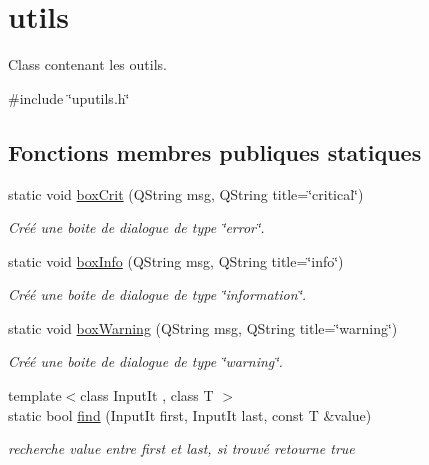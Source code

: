 \hypertarget{classutils}{}\section{utils}
\label{classutils}


Class contenant les outils.  




{\ttfamily \#include \char`\"{}uputils.\+h\char`\"{}}

\subsection*{Fonctions membres publiques statiques}
\begin{DoxyCompactItemize}
\item 
static void \hyperlink{classutils_a75e4c12b24b35e930fe42d654e8f5d7a}{box\+Crit} (Q\+String msg, Q\+String title=\char`\"{}critical\char`\"{})
\begin{DoxyCompactList}\small\item\em Créé une boite de dialogue de type \char`\"{}error\char`\"{}. \end{DoxyCompactList}\item 
static void \hyperlink{classutils_aed917b49e1356903b63626302d9adcc2}{box\+Info} (Q\+String msg, Q\+String title=\char`\"{}info\char`\"{})
\begin{DoxyCompactList}\small\item\em Créé une boite de dialogue de type \char`\"{}information\char`\"{}. \end{DoxyCompactList}\item 
static void \hyperlink{classutils_a0621bcdcce14a9175584c8937abb55f4}{box\+Warning} (Q\+String msg, Q\+String title=\char`\"{}warning\char`\"{})
\begin{DoxyCompactList}\small\item\em Créé une boite de dialogue de type \char`\"{}warning\char`\"{}. \end{DoxyCompactList}\item 
{\footnotesize template$<$class Input\+It , class T $>$ }\\static bool \hyperlink{classutils_a9b2123e5c94d7736f5f32ab222d194df}{find} (Input\+It first, Input\+It last, const T \&value)
\begin{DoxyCompactList}\small\item\em recherche value entre first et last, si trouvé retourne true \end{DoxyCompactList}\item 

\end{DoxyCompactItemize}
